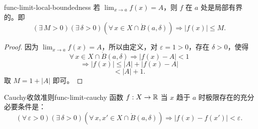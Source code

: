 \begin{myproperty}{}{func-limit-local-boundedness}
	若 \(\lim_{x\to a}f(x)=A\)，则 \(f\) 在 \(a\) 处是局部有界的。即
	\[
	(\exists\,M>0)(\exists\,\delta>0)(\forall\,x\in X\cap\mathring{B}(a,\delta))\Longrightarrow |f(x)|\le M.
	\]
\end{myproperty}

\begin{proof}
	因为 \(\lim_{x\to a}f(x)=A\)，所以由定义，对 \(\varepsilon=1>0\)，存在 \(\delta>0\)，使得
	\[
	\forall\,x\in X\cap\mathring{B}(a,\delta)\Longrightarrow |f(x)-A|<1
	\]
	\[
	\Longrightarrow |f(x)|\le|A|+|f(x)-A|
	\]
	\[
	<|A|+1.
	\]
	取 \(M=1+|A|\) 即可。
\end{proof}

\begin{myproperty}{Cauchy收敛准则}{func-limit-cauchy}
	函数 \(f:X\to\mathbb{R}\) 当 \(x\) 趋于 \(a\) 时极限存在的充分必要条件是：
	\[
	(\forall\,\varepsilon>0)(\exists\,\delta>0)(\forall\,x,x'\in X\cap\mathring{B}(a,\delta))\Longrightarrow |f(x)-f(x')|<\varepsilon.
	\]
\end{myproperty}


